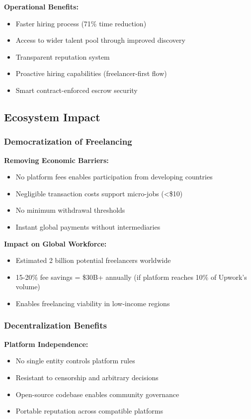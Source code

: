 \documentclass[a4paper,13pt,twoside]{report}
\theoremstyle{definition}
\begin{document}
\textbf{Operational Benefits:}
\begin{itemize}
    \item Faster hiring process (71\% time reduction)
    \item Access to wider talent pool through improved discovery
    \item Transparent reputation system
    \item Proactive hiring capabilities (freelancer-first flow)
    \item Smart contract-enforced escrow security
\end{itemize}

\subsection{Ecosystem Impact}

\subsubsection{Democratization of Freelancing}

\textbf{Removing Economic Barriers:}
\begin{itemize}
    \item No platform fees enables participation from developing countries
    \item Negligible transaction costs support micro-jobs (<\$10)
    \item No minimum withdrawal thresholds
    \item Instant global payments without intermediaries
\end{itemize}

\textbf{Impact on Global Workforce:}
\begin{itemize}
    \item Estimated 2 billion potential freelancers worldwide
    \item 15-20\% fee savings = \$30B+ annually (if platform reaches 10\% of Upwork's volume)
    \item Enables freelancing viability in low-income regions
\end{itemize}

\subsubsection{Decentralization Benefits}

\textbf{Platform Independence:}
\begin{itemize}
    \item No single entity controls platform rules
    \item Resistant to censorship and arbitrary decisions
    \item Open-source codebase enables community governance
    \item Portable reputation across compatible platforms
\end{itemize}
\end{document}
